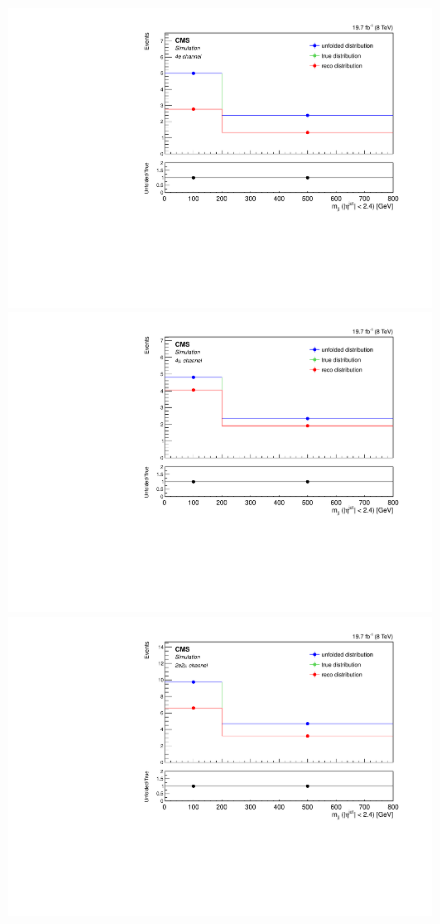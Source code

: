 \begin{figure}[hbtp]
  \begin{center}
    \includegraphics[width=0.8\cmsFigWidth]{Figures/Unfolding/MCTests/CentralMjj_ZZTo4e_MadMatrix_MadDistr_FullSample_fr}     
    \includegraphics[width=0.8\cmsFigWidth]{Figures/Unfolding/MCTests/CentralMjj_ZZTo4m_MadMatrix_MadDistr_FullSample_fr}     
    \includegraphics[width=0.8\cmsFigWidth]{Figures/Unfolding/MCTests/CentralMjj_ZZTo2e2m_MadMatrix_MadDistr_FullSample_fr}

\end{center}
\end{figure}
